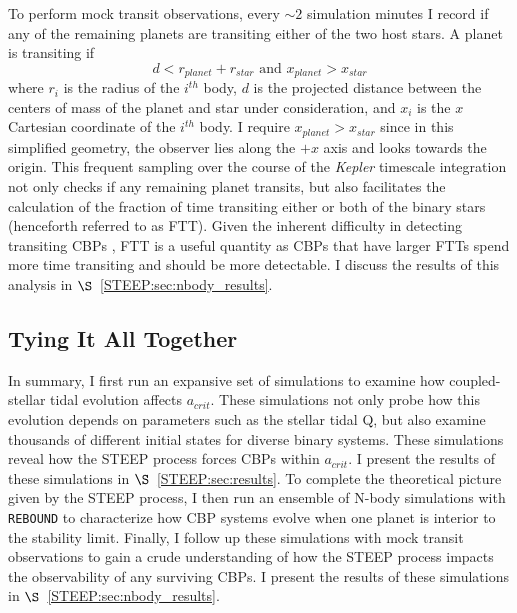 To perform mock transit observations, every ${\sim}2$ simulation minutes I record if any of the remaining planets are transiting either of the two host stars.  A planet is transiting if
\begin{equation} \label{eqn:transit}
d < r_{planet} + r_{star} \text{ and } x_{planet} > x_{star}
\end{equation}
where $r_{i}$ is the radius of the $i^{th}$ body, $d$ is the projected distance between the centers of mass of the planet and star under consideration, and $x_{i}$ is the $x$ Cartesian coordinate of the $i^{th}$ body.  I require $x_{planet} > x_{star}$ since in this simplified geometry, the observer lies along the $+x$ axis and looks towards the origin.  This frequent sampling over the course of the \textit{Kepler} timescale integration not only checks if any remaining planet transits, but also facilitates the calculation of the fraction of time transiting either or both of the binary stars (henceforth referred to as FTT).  Given the inherent difficulty in detecting transiting CBPs \citep[e.g.][]{Welsh2014,Winn2015}, FTT is a useful quantity as CBPs that have larger FTTs spend more time transiting and should be more detectable.  I discuss the results of this analysis in $\S$~\ref{STEEP:sec:nbody_results}.

\subsection{Tying It All Together}

In summary, I first run an expansive set of \vplanet simulations to examine how coupled-stellar tidal evolution affects $a_{crit}$.  These simulations not only probe how this evolution depends on parameters such as the stellar tidal Q, but also examine thousands of different initial states for diverse binary systems.  These simulations reveal how the STEEP process forces CBPs within $a_{crit}$.  I present the results of these simulations in $\S$~\ref{STEEP:sec:results}.  To complete the theoretical picture given by the STEEP process, I then run an ensemble of N-body simulations with \texttt{REBOUND} to characterize how CBP systems evolve when one planet is interior to the stability limit.  Finally, I follow up these simulations with mock transit observations to gain a crude understanding of how the STEEP process impacts the observability of any surviving CBPs.  I present the results of these simulations in $\S$~\ref{STEEP:sec:nbody_results}.


